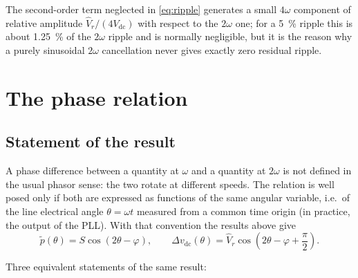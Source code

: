 \documentclass[11pt,a4paper]{article}
\begin{document}
The second-order term neglected in \eqref{eq:ripple} generates a small
$4\omega$ component of relative amplitude $\hat V_r/(4V_{\mathrm{dc}})$ with
respect to the $2\omega$ one; for a \SI{5}{\percent} ripple this is about
\SI{1.25}{\percent} of the $2\omega$ ripple and is normally negligible, but it
is the reason why a purely sinusoidal $2\omega$ cancellation never gives exactly
zero residual ripple.

\section{The phase relation}

\subsection{Statement of the result}

A phase difference between a quantity at $\omega$ and a quantity at $2\omega$ is
not defined in the usual phasor sense: the two rotate at different speeds. The
relation is well posed only if both are expressed as functions of the same
angular variable, i.e.\ of the line electrical angle $\theta = \omega t$ measured
from a common time origin (in practice, the output of the PLL). With that
convention the results above give
\begin{equation}
  \tilde p(\theta) = S \cos(2\theta - \varphi),
  \qquad
  \Delta v_{\mathrm{dc}}(\theta) =
  \hat V_r \cos\!\left(2\theta - \varphi + \frac{\pi}{2}\right).
  \label{eq:theta}
\end{equation}

Three equivalent statements of the same result:
\end{document}
